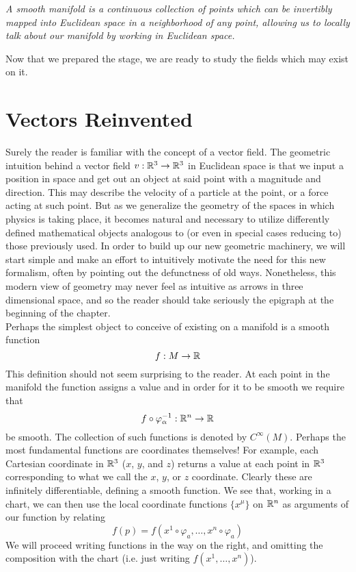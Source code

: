 \begin{concept}
\textit{A smooth manifold is a continuous collection of points which can be invertibly mapped into Euclidean space in a neighborhood of any point, allowing us to locally talk about our manifold by working in Euclidean space.}
\end{concept}

Now that we prepared the stage, we are ready to study the fields which may exist on it.  

\section*{Vectors Reinvented} 
Surely the reader is familiar with the concept of a vector field.  The geometric intuition behind a vector field $v:\mathbb{R}^3 \to \mathbb{R}^3$  in Euclidean space is that we input a position in space and get out an object at said point with a magnitude and direction.  This may describe the velocity of a particle at the point, or a force acting at such point.  But as we generalize the geometry of the spaces in which physics is taking place, it becomes natural and necessary to utilize differently defined mathematical objects analogous to (or even in special cases reducing to) those previously used.  In order to build up our new geometric machinery, we will start simple and make an effort to intuitively motivate the need for this new formalism, often by pointing out the defunctness of old ways.  Nonetheless, this modern view of geometry may never feel as intuitive as arrows in three dimensional space, and so the reader should take seriously the epigraph at the beginning of the chapter. \\

Perhaps the simplest object to conceive of existing on a manifold is a smooth function 
\begin{equation*}
	f: M \to \mathbb{R}
\end{equation*}
This definition should not seem surprising to the reader.  At each point in the manifold the function assigns a value and in order for it to be smooth we require that 
\begin{equation*}
	f\circ \varphi^{-1}_\alpha: \mathbb{R}^n \to \mathbb{R}
\end{equation*}
be smooth.  The collection of such functions is denoted by $C^\infty(M)$.  Perhaps the most fundamental functions are coordinates themselves!  For example, each Cartesian coordinate in $\mathbb{R}^3$ ($x$, $y$, and $z$) returns a value at each point in $\mathbb{R}^3$ corresponding to what we call the $x$, $y$, or $z$ coordinate.  Clearly these are infinitely differentiable, defining a smooth function.  We see that, working in a chart, we can then use the local coordinate functions $\{x^\mu \}$ on $\mathbb{R}^n$ as arguments of our function by relating 
\begin{equation*}
	f(p) = f(x^1 \circ \varphi_a, \dots, x^n \circ \varphi_a)
\end{equation*}
We will proceed writing functions in the way on the right, and omitting the composition with the chart (i.e. just writing $f(x^1, \dots, x^n)$).\\

